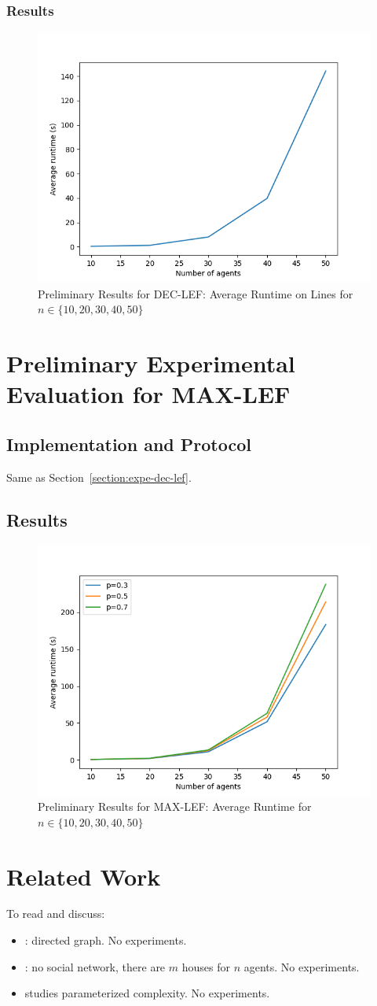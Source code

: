\documentclass{article}
\begin{document}
\subsubsection{Results}
\begin{figure}[htb]
\centering
\includegraphics[width=0.5\linewidth]{prelim-line-results.png}
\caption{Preliminary Results for DEC-LEF: Average Runtime on Lines for $n \in \{10,20,30,40,50\}$}
\end{figure}

\section{Preliminary Experimental Evaluation for MAX-LEF}
\subsection{Implementation and Protocol}
Same as Section~\ref{section:expe-dec-lef}.

\subsection{Results}
\begin{figure}[htb]
\centering
\includegraphics[width=0.5\linewidth]{prelim-results-optim.png}
\caption{Preliminary Results for MAX-LEF: Average Runtime for $n \in \{10,20,30,40,50\}$}
\end{figure}

\section{Related Work}
To read and discuss:
\begin{itemize}
	\item \cite{Bredereck0N18}: directed graph. No experiments.
	\item \cite{GanSV19}: no social network, there are $m$ houses for $n$ agents. No experiments.
	\item \cite{EibenGHO20} studies parameterized complexity. No experiments.
\end{itemize}

  
 
\end{document}
